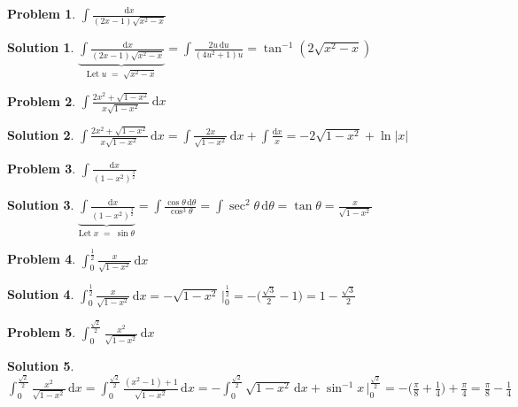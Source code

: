 \documentclass[11pt,a4paper]{article}
\newcommand{\ds}{\displaystyle}
\theoremstyle{definition}
\newtheorem*{problem}{Problem}
\newtheorem*{solution}{Solution}
\begin{document}
\begin{problem}
  $\ds\int\!\frac{\text{d}x}{(2x-1)\sqrt{x^2-x}}$
\end{problem}

\begin{solution}
  $\ds\underbrace{\int\!\frac{\text{d}x}{(2x-1)\sqrt{x^2-x}}}_{\text{Let}\; u\;=\;\sqrt{x^2 - x}} = \int\!\frac{2u\,\text{d}u}{(4u^2 + 1)u} = \tan^{-1}(2\sqrt{x^2 - x})$
\end{solution}

\begin{problem}
  $\ds\int\!\frac{2x^2 + \sqrt{1 - x^2}}{x\sqrt{1 - x^2}} \,\text{d}x$
\end{problem}

\begin{solution}
  $\ds\int\!\frac{2x^2 + \sqrt{1 - x^2}}{x\sqrt{1 - x^2}}\,\text{d}x = \int\!\frac{2x}{\sqrt{1 - x^2}}\,\text{d}x + \int\!\frac{\text{d}x}{x} = -2\sqrt{1 - x^2} + \ln|x|$
\end{solution}

\begin{problem}
  $\ds\int\!\frac{\text{d}x}{(1-x^2)^{\frac{3}{2}}}$
\end{problem}

\begin{solution}
  $\ds\underbrace{\int\!\frac{\text{d}x}{(1-x^2)^{\frac{3}{2}}}}_{\text{Let}\; x\;=\;\sin\theta} = \int\!\frac{\cos\theta\,\text{d}\theta}{\cos^3\!\theta} = \int\!\sec^2\!\theta\,\text{d}\theta = \tan\theta = \frac{x}{\sqrt{1 - x^2}}$
\end{solution}

\begin{problem}
  $\ds\int_0^{\frac{1}{2}}\!\frac{x}{\sqrt{1-x^2}}\,\text{d}x$
\end{problem}

\begin{solution}
  $\ds\int_0^{\frac{1}{2}}\!\frac{x}{\sqrt{1-x^2}}\,\text{d}x = -\sqrt{1 - x^2}\,\Big|_0^{\frac{1}{2}} = -\Big(\frac{\sqrt{3}}{2} - 1\Big) = 1 - \frac{\sqrt{3}}{2}$
\end{solution}

\begin{problem}
  $\ds\int_0^{\frac{\sqrt{2}}{2}}\!\frac{x^2}{\sqrt{1-x^2}}\,\text{d}x$
\end{problem}

\begin{solution}
  $\ds\int_0^{\frac{\sqrt{2}}{2}}\!\frac{x^2}{\sqrt{1-x^2}}\,\text{d}x = \int_0^{\frac{\sqrt{2}}{2}}\!\frac{(x^2 - 1) + 1}{\sqrt{1-x^2}}\,\text{d}x = -\int_0^{\frac{\sqrt{2}}{2}}\!\!\!\sqrt{1 - x^2}\,\text{d}x + \sin^{-1}{x}\,\Big|_0^{\frac{\sqrt{2}}{2}} = -\Big(\frac{\pi}{8} + \frac{1}{4}\Big) + \frac{\pi}{4} = \frac{\pi}{8} - \frac{1}{4}$
\end{solution}
\end{document}
